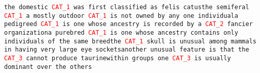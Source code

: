\texttt{the domestic \textcolor{red}{CAT\_1} was first classified as felis catus\newline the semiferal \textcolor{red}{CAT\_1} a mostly outdoor \textcolor{red}{CAT\_1} is not owned by any one individual\newline a pedigreed \textcolor{red}{CAT\_1} is one whose ancestry is recorded by a \textcolor{red}{CAT\_2} fancier organization\newline a purebred \textcolor{red}{CAT\_1} is one whose ancestry contains only individuals of the same breed\newline the \textcolor{red}{CAT\_1} skull is unusual among mammals in having very large eye sockets\newline another unusual feature is that the \textcolor{red}{CAT\_3} cannot produce taurine\newline within groups one \textcolor{red}{CAT\_3} is usually dominant over the others}